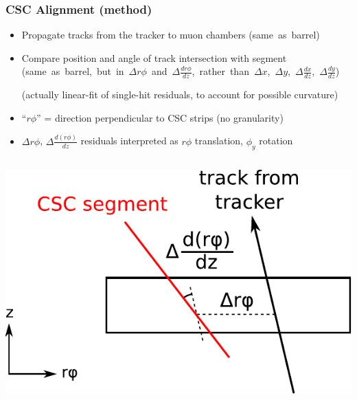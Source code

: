 \documentclass[compress]{beamer}
\begin{document}
\begin{frame}
\frametitle{CSC Alignment (method)}

\begin{itemize}
\item Propagate tracks from the tracker to muon chambers \mbox{(same
  as barrel)\hspace{-1 cm}}
\item Compare position and angle of track intersection with segment
  \mbox{(same as barrel, but in $\Delta r\phi$ and $\Delta
  \frac{dr\phi}{dz}$, rather than $\Delta x$, $\Delta y$, $\Delta
  \frac{dx}{dz}$, $\Delta \frac{dy}{dz}$)\hspace{-1 cm}}

{\scriptsize (actually linear-fit of single-hit residuals, to account for possible curvature)}

\item ``$r\phi$'' = direction perpendicular to CSC strips (no granularity)

\item $\Delta r\phi$, $\Delta \frac{d(r\phi)}{dz}$ residuals interpreted as $r\phi$ translation, $\phi_y$ rotation
\end{itemize}

\begin{columns}
\begin{center}
\includegraphics[width=0.7\linewidth]{explanation.pdf}
\end{center}


\end{columns}
\end{frame}
\end{document}

